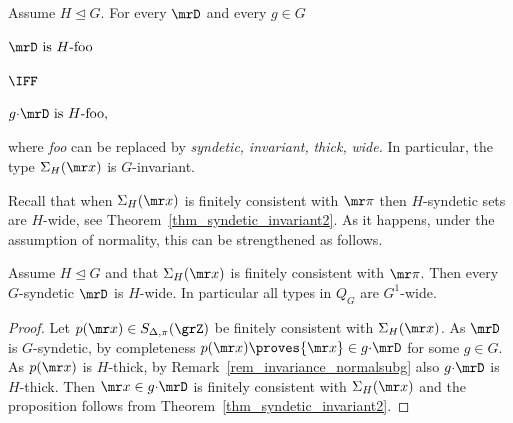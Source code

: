 \begin{remark}\label{rem_invariance_normalsubg}
\def\medrel#1{\parbox[t]{5ex}{$\displaystyle\hfil #1$}}
\def\ceq#1#2#3{\parbox[t]{20ex}{$\displaystyle #1$}\medrel{#2}{$\displaystyle #3$}}
  Assume $H\trianglelefteq G$.
  For every $\mrD$ and every $g\in G$ \smallskip
  
  \ceq{\hfill\mrD\textrm{ is }H\textrm{-foo}}{\IFF}{g{\cdot}\mrD\textrm{ is }H\textrm{-foo},} \smallskip
  
  where \textit{foo\/} can be replaced by \textit{syndetic,} \textit{invariant,} \textit{thick,} \textit{wide.}
  In particular, the type $\Sigma_H({\mr x})$ is $G$-invariant.
\end{remark}

Recall that when $\Sigma_H({\mr x})$ is finitely consistent with ${\mr\pi}$ then $H$-syndetic sets are $H$-wide, see Theorem~\ref{thm_syndetic_invariant2}.
As it happens, under the assumption of normality, this can be strengthened as follows.

\begin{proposition}\label{prop_Gsyndetic_Hthick1}
  Assume $H\trianglelefteq G$ and that $\Sigma_H({\mr x})$ is finitely consistent with ${\mr\pi}$.
  Then every $G$-syndetic $\mrD$ is $H$-wide.
  In particular all types in $Q_G$ are $G^1$-wide.
\end{proposition}

\begin{proof}
  Let $p({\mr x})\in S_{\Delta,\pi}(\grZ)$ be finitely consistent with $\Sigma_H({\mr x})$.
  As $\mrD$ is $G$-syndetic, by completeness $p({\mr x})\proves{\mr x}\in g{\cdot}\mrD$ for some $g\in G$.
  As $p({\mr x})$ is $H$-thick, by Remark~\ref{rem_invariance_normalsubg} also $g{\cdot}\mrD$ is $H$-thick.
  Then ${\mr x}\in g{\cdot}\mrD$ is finitely consistent with $\Sigma_H({\mr x})$ and the proposition follows from Theorem~\ref{thm_syndetic_invariant2}.
\end{proof}

